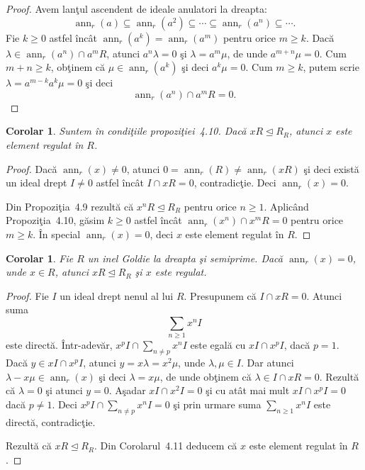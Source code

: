 \documentclass[12pt,a4paper]{book}
\DeclareMathOperator{\ann}{ann}
\newcommand{\ess}{\trianglelefteq}  %
\theoremstyle{plain}
\newtheorem{corollary}[theorem]{Corolar}
\theoremstyle{definition}
\theoremstyle{remark}
\begin{document}
\begin{proof}
Avem lanţul ascendent de ideale anulatori la dreapta:
\[
  \ann_r(a) \subseteq \ann_r(a^2) \subseteq \cdots \subseteq \ann_r(a^n)
  \subseteq \cdots .
\]
Fie $k \geq 0$ astfel încât $\ann_r(a^k) = \ann_r(a^m)$ pentru orice
$m \geq k$. Dacă $\lambda \in \ann_r(a^n) \cap a^mR$, atunci
$a^n \lambda = 0$ şi $\lambda = a^m\mu$, de unde $a^{m+n}\mu = 0$.
Cum $m+n \geq k$, obţinem că $\mu \in \ann_r(a^k)$ şi deci
$a^k\mu = 0$. Cum $m \geq k$, putem scrie
$\lambda = a^{m-k}a^k\mu = 0$ şi deci
\[
  \ann_r(a^n) \cap a^mR = 0 .
\]
\end{proof}


\begin{corollary}
Suntem în condiţiile propoziţiei~4.10. Dacă $xR \ess R_R$, atunci
$x$ este element regulat în $R$.
\end{corollary}

\begin{proof}
Dacă $\ann_r(x) \neq 0$, atunci $0 = \ann_r(R) \neq \ann_r(xR)$ şi deci
există un ideal drept $I \neq 0$ astfel încât $I \cap xR = 0$,
contradicţie. Deci $\ann_r(x) = 0$.

Din Propoziţia~4.9 rezultă că $x^nR \ess R_R$ pentru orice $n \geq 1$.
Aplicând Propoziţia~4.10, găsim $k \geq 0$ astfel încât
$\ann_r(x^n) \cap x^mR = 0$ pentru orice $m \geq k$. În special
$\ann_r(x) = 0$, deci $x$ este element regulat în $R$.
\end{proof}


\begin{corollary}
Fie $R$ un inel Goldie la dreapta şi semiprime. Dacă $\ann_r(x) = 0$,
unde $x \in R$, atunci $xR \ess R_R$ şi $x$ este regulat.
\end{corollary}

\begin{proof}
Fie $I$ un ideal drept nenul al lui $R$. Presupunem că
$I \cap xR = 0$. Atunci suma
\[
  \sum_{n \geq 1} x^n I
\]
este directă. Într-adevăr,
$x^p I \cap \sum_{n \neq p} x^n I$ este egală cu $xI \cap x^p I$,
dacă $p = 1$. Dacă $y \in xI \cap x^p I$, atunci
$y = x\lambda = x^2\mu$, unde $\lambda,\mu \in I$. Dar atunci
$\lambda - x\mu \in \ann_r(x)$ şi deci $\lambda = x\mu$, de unde
obţinem că $\lambda \in I \cap xR = 0$. Rezultă că $\lambda = 0$
şi atunci $y = 0$. Aşadar $xI \cap x^2 I = 0$ şi cu atât mai mult
$xI \cap x^p I = 0$ dacă $p \neq 1$. Deci
$x^p I \cap \sum_{n \neq p} x^n I = 0$ şi prin urmare suma
$\sum_{n \geq 1} x^n I$ este directă, contradicţie.

Rezultă că $xR \ess R_R$. Din Corolarul~4.11 deducem că $x$ este
element regulat în $R$.
\end{proof}
\end{document}
